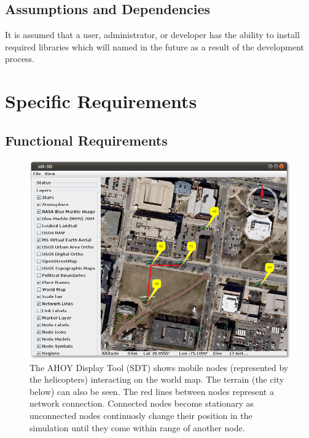 \documentclass[titlepage]{article}
\begin{document}
\subsection{Assumptions and Dependencies%
  \label{assumptions-and-dependencies}%
}

It is assumed that a user, administrator, or developer has the ability to install required libraries which will named in the future as a result of the development process.


\section{Specific Requirements%
  \label{specific-requirements}%
}

\subsection{Functional Requirements%
    \label{functional}%
}


\begin{figure}[hb]
  \centering
  \includegraphics[scale=.3]{../prototype/images/ss2.png}
  \caption[A screenshot of the AHOY Display Tool (SDT)]%
  {The AHOY Display Tool (SDT) shows mobile nodes (represented by the helicopters) interacting on the world map.  The terrain (the city below) can
  also be seen.  The red lines between nodes represent a network connection.  Connected nodes become stationary as
  unconnected nodes continuosly change their position in the simulation until they come within range of another node.}
\end{figure}
\end{document}
